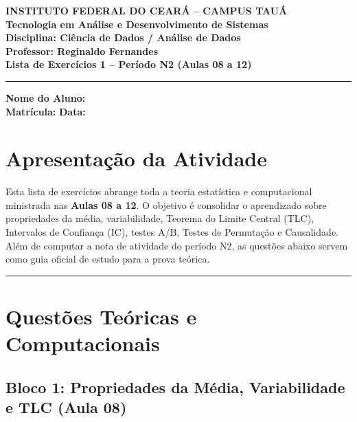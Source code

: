 \documentclass[12pt]{article}
\begin{document}
\begin{center}
    \vspace{0.5cm}
    \textbf{INSTITUTO FEDERAL DO CEARÁ -- CAMPUS TAUÁ} \\
    \textbf{Tecnologia em Análise e Desenvolvimento de Sistemas} \\
    \textbf{Disciplina: Ciência de Dados / Análise de Dados} \\
    \textbf{Professor: Reginaldo Fernandes} \\
    \vspace{0.5cm}
    \large{\textbf{Lista de Exercícios 1 -- Período N2 (Aulas 08 a 12)}}
    \vspace{0.3cm}
\end{center}

\hrule
\noindent\textbf{Nome do Aluno:} \hrulefill \\
\noindent\textbf{Matrícula:} \hrulefill \hfill \textbf{Data:} \hrulefill

\vspace{0.5cm}

\section*{Apresentação da Atividade}
Esta lista de exercícios abrange toda a teoria estatística e computacional ministrada nas \textbf{Aulas 08 a 12}. O objetivo é consolidar o aprendizado sobre propriedades da média, variabilidade, Teorema do Limite Central (TLC), Intervalos de Confiança (IC), testes A/B, Testes de Permutação e Causalidade. Além de computar a nota de atividade do período N2, as questões abaixo servem como guia oficial de estudo para a prova teórica.

\vspace{0.3cm}
\hrule
\vspace{0.5cm}

\section*{Questões Teóricas e Computacionais}

\subsection*{Bloco 1: Propriedades da Média, Variabilidade e TLC (Aula 08)}
\end{document}
